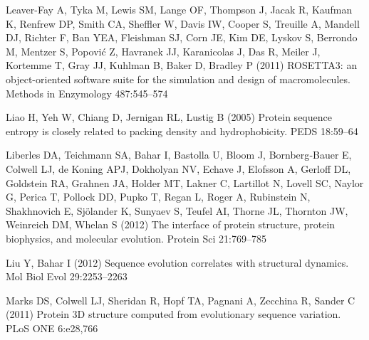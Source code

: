 \documentclass[smallextended]{svjour3}
\begin{document}
\begin{thebibliography}{55}
Leaver-Fay A, Tyka M, Lewis SM, Lange OF, Thompson J, Jacak R, Kaufman K,
  Renfrew DP, Smith CA, Sheffler W, Davis IW, Cooper S, Treuille A, Mandell DJ,
  Richter F, Ban YEA, Fleishman SJ, Corn JE, Kim DE, Lyskov S, Berrondo M,
  Mentzer S, Popovi\'c Z, Havranek JJ, Karanicolas J, Das R, Meiler J, Kortemme
  T, Gray JJ, Kuhlman B, Baker D, Bradley P (2011) {ROSETTA3:} an
  object-oriented software suite for the simulation and design of
  macromolecules. Methods in Enzymology 487:545--574

Liao H, Yeh W, Chiang D, Jernigan RL, Lustig B (2005) Protein sequence entropy
  is closely related to packing density and hydrophobicity. PEDS 18:59--64

Liberles DA, Teichmann SA, Bahar I, Bastolla U, Bloom J, {Bornberg‐Bauer} E,
  Colwell LJ, {de Koning} APJ, Dokholyan NV, Echave J, Elofsson A, Gerloff DL,
  Goldstein RA, Grahnen JA, Holder MT, Lakner C, Lartillot N, Lovell SC, Naylor
  G, Perica T, Pollock DD, Pupko T, Regan L, Roger A, Rubinstein N, Shakhnovich
  E, Sj\"o{}lander K, Sunyaev S, Teufel AI, Thorne JL, Thornton JW, Weinreich
  DM, Whelan S (2012) The interface of protein structure, protein biophysics,
  and molecular evolution. Protein Sci 21:769--785

Liu Y, Bahar I (2012) Sequence evolution correlates with structural dynamics.
  Mol Biol Evol 29:2253--2263

Marks DS, Colwell LJ, Sheridan R, Hopf TA, Pagnani A, Zecchina R, Sander C
  (2011) Protein {3D} structure computed from evolutionary sequence variation.
  PLoS ONE 6:e28,766


\end{thebibliography}
\end{document}
